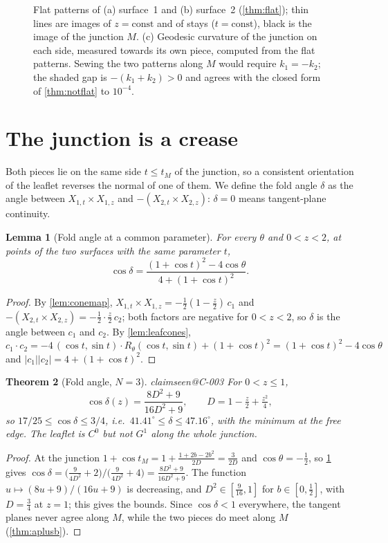 \documentclass[11pt,a4paper]{article}
\makeatletter
\theoremstyle{plain}
\newtheorem{theorem}{Theorem}[section]
\newtheorem{lemma}[theorem]{Lemma}
\theoremstyle{remark}
\newcommand{\claim}[1]{\ifcsname claimseen@#1\endcsname\else\expandafter\gdef\csname claimseen@#1\endcsname{}\label{claim:#1}\fi}
\makeatother
\begin{document}
\begin{figure}[t]\centering

\caption{Flat patterns of (a) surface~1 and (b) surface~2 (\cref{thm:flat}); thin lines are images of $z=\mathrm{const}$
and of stays ($t=\mathrm{const}$), black is the image of the junction $M$. (c) Geodesic curvature of the junction on each
side, measured towards its own piece, computed from the flat patterns. Sewing the two patterns along $M$ would require
$k_1=-k_2$; the shaded gap is $-(k_1+k_2)>0$ and agrees with the closed form of \cref{thm:notflat} to $10^{-4}$.}
\label{fig:flat}
\end{figure}

\section{The junction is a crease}\label{sec:crease}

Both pieces lie on the same side $t\le t_M$ of the junction, so a consistent orientation of the leaflet reverses the
normal of one of them. We define the fold angle $\delta$ as the angle between $X_{1,t}\times X_{1,z}$ and
$-(X_{2,t}\times X_{2,z})$: $\delta=0$ means tangent-plane continuity.

\begin{lemma}[Fold angle at a common parameter]\label{lem:foldt}
For every $\theta$ and $0<z<2$, at points of the two surfaces with the same parameter $t$,
\[ \cos\delta=\frac{(1+\cos t)^2-4\cos\theta}{4+(1+\cos t)^2}. \]
\end{lemma}
\begin{proof}
By \cref{lem:conemap}, $X_{1,t}\times X_{1,z}=-\frac12(1-\frac z2)\,c_1$ and $-(X_{2,t}\times X_{2,z})=-\frac12\cdot\frac z2\,c_2$;
both factors are negative for $0<z<2$, so $\delta$ is the angle between $c_1$ and $c_2$. By \cref{lem:leafcones},
$c_1\cdot c_2=-4\,(\cos t,\sin t)\cdot R_\theta(\cos t,\sin t)+(1+\cos t)^2=(1+\cos t)^2-4\cos\theta$ and
$|c_1||c_2|=4+(1+\cos t)^2$.
\end{proof}

\begin{theorem}[Fold angle, $N=3$]\label{thm:fold3}\claim{C-003}
For $0<z\le1$,
\[ \cos\delta(z)=\frac{8D^2+9}{16D^2+9},\qquad D=1-\tfrac z2+\tfrac{z^2}4, \]
so $17/25\le\cos\delta\le3/4$, i.e.\ $41.41^\circ\le\delta\le47.16^\circ$, with the minimum at the free edge. The leaflet
is $C^0$ but not $G^1$ along the whole junction.
\end{theorem}
\begin{proof}
At the junction $1+\cos t_M=1+\frac{1+2b-2b^2}{2D}=\frac{3}{2D}$ and $\cos\theta=-\frac12$, so \cref{lem:foldt} gives
$\cos\delta=\big(\frac{9}{4D^2}+2\big)/\big(\frac{9}{4D^2}+4\big)=\frac{8D^2+9}{16D^2+9}$. The function
$u\mapsto(8u+9)/(16u+9)$ is decreasing, and $D^2\in[\frac9{16},1]$ for $b\in[0,\frac12]$, with $D=\frac34$ at $z=1$;
this gives the bounds. Since $\cos\delta<1$ everywhere, the tangent planes never agree along $M$, while the two pieces do
meet along $M$ (\cref{thm:aplusb}).
\end{proof}
\end{document}
